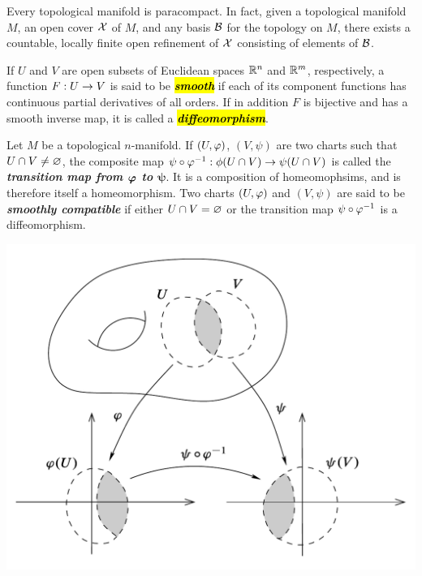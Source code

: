 \setcounter{thm}{14}

\begin{thm}
Every topological manifold is paracompact. In fact, given a topological manifold $M$, an open cover $\mathcal{X}$ of $M$, and any basis $\mathcal{B}$ for the topology on $M$, there exists a countable, locally finite open refinement of $\mathcal{X}$ consisting of elements of $\mathcal{B}$.
\end{thm}

\dfn If $U$ and $V$ are open subsets of Euclidean spaces $\mathbb{R}^n$ and $\mathbb{R}^m$, respectively, a function $F:U\rightarrow V$ is said to be \hl{\textbf{\textit{smooth}}} if each of its component functions has continuous partial derivatives of all orders. If in addition $F$ is bijective and has a smooth inverse map, it is called a \hl{\textbf{\textit{diffeomorphism}}}.

\dfn Let $M$ be a topological $n$-manifold. If $(U, \varphi)$, $(V,\psi)$ are two charts such that $U\cap V\neq \varnothing$, the composite map $\psi\circ\varphi^{-1}:\phi(U\cap V) \rightarrow \psi(U\cap V)$ is called the \textbf{\textit{transition map from $\boldsymbol{\varphi}$ to $\boldsymbol{\psi}$}}. It is a composition of homeomophsims, and is therefore itself a homeomorphism. Two charts $(U,\varphi)$ and $(V,\psi)$ are said to be \textbf{\textit{smoothly compatible}} if either $U\cap V = \varnothing$ or the transition map $\psi\circ\varphi^{-1}$ is a diffeomorphism.

\begin{center}
    \includegraphics[scale = 0.4]{chapter01/c1f6.png}
\end{center}


